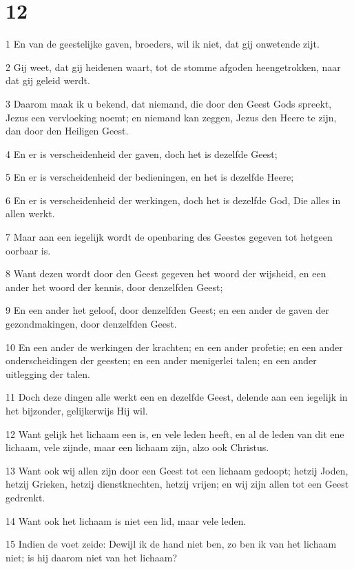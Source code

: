 \chapter{12}

\par 1 En van de geestelijke gaven, broeders, wil ik niet, dat gij onwetende zijt.
\par 2 Gij weet, dat gij heidenen waart, tot de stomme afgoden heengetrokken, naar dat gij geleid werdt.
\par 3 Daarom maak ik u bekend, dat niemand, die door den Geest Gods spreekt, Jezus een vervloeking noemt; en niemand kan zeggen, Jezus den Heere te zijn, dan door den Heiligen Geest.
\par 4 En er is verscheidenheid der gaven, doch het is dezelfde Geest;
\par 5 En er is verscheidenheid der bedieningen, en het is dezelfde Heere;
\par 6 En er is verscheidenheid der werkingen, doch het is dezelfde God, Die alles in allen werkt.
\par 7 Maar aan een iegelijk wordt de openbaring des Geestes gegeven tot hetgeen oorbaar is.
\par 8 Want dezen wordt door den Geest gegeven het woord der wijsheid, en een ander het woord der kennis, door denzelfden Geest;
\par 9 En een ander het geloof, door denzelfden Geest; en een ander de gaven der gezondmakingen, door denzelfden Geest.
\par 10 En een ander de werkingen der krachten; en een ander profetie; en een ander onderscheidingen der geesten; en een ander menigerlei talen; en een ander uitlegging der talen.
\par 11 Doch deze dingen alle werkt een en dezelfde Geest, delende aan een iegelijk in het bijzonder, gelijkerwijs Hij wil.
\par 12 Want gelijk het lichaam een is, en vele leden heeft, en al de leden van dit ene lichaam, vele zijnde, maar een lichaam zijn, alzo ook Christus.
\par 13 Want ook wij allen zijn door een Geest tot een lichaam gedoopt; hetzij Joden, hetzij Grieken, hetzij dienstknechten, hetzij vrijen; en wij zijn allen tot een Geest gedrenkt.
\par 14 Want ook het lichaam is niet een lid, maar vele leden.
\par 15 Indien de voet zeide: Dewijl ik de hand niet ben, zo ben ik van het lichaam niet; is hij daarom niet van het lichaam?
